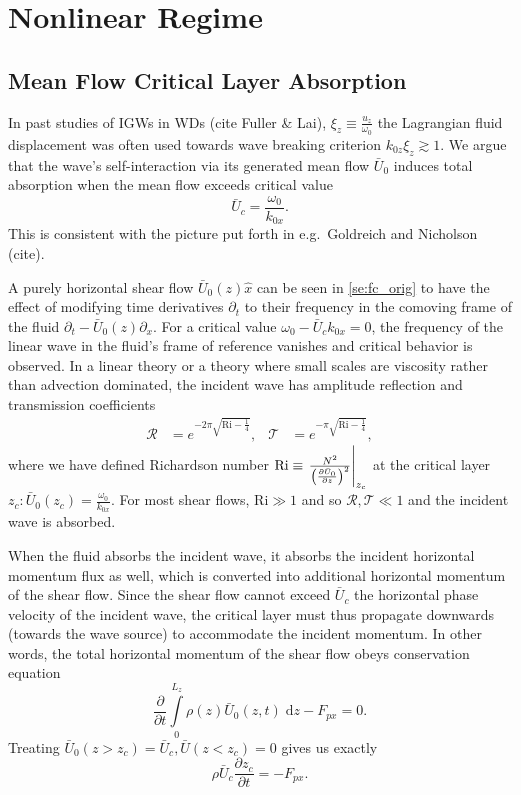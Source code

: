 \documentclass[twocolumn,
        usenames, %
        dvipsnames %
    ]{revtex4-1}%
\newcommand*{\pd}[2]{\frac{\partial#1}{\partial#2}}
\newcommand*{\at}[1]{\left.#1\right|}
\DeclarePairedDelimiter\p{\lparen}{\rparen}
\begin{document}
\section{Nonlinear Regime}\label{s:nonlin}

\subsection{Mean Flow Critical Layer Absorption}

In past studies of IGWs in WDs (cite Fuller \& Lai), $\xi_z \equiv
\frac{u_z}{\omega_0}$ the Lagrangian fluid displacement was often used towards
wave breaking criterion $k_{0z}\xi_z \gtrsim 1$. We argue that the wave's
self-interaction via its generated mean flow $\bar{U}_0$ induces total
absorption when the mean flow exceeds critical value
\begin{equation}
    \bar{U}_c = \frac{\omega_0}{k_{0x}}.
\end{equation}
This is consistent with the picture put forth in e.g.\ Goldreich and Nicholson
(cite).

A purely horizontal shear flow $\bar{U}_0(z) \hat{x}$ can be seen in
\autoref{se:fc_orig} to have the effect of modifying time derivatives
$\partial_t$ to their frequency in the comoving frame of the fluid $\partial_t -
\bar{U}_0(z)\partial_x$. For a critical value $\omega_0 - \bar{U}_c k_{0x} = 0$,
the frequency of the linear wave in the fluid's frame of reference vanishes and
critical behavior is observed. In a linear theory or a theory where small scales
are viscosity rather than advection dominated, the incident wave has amplitude
reflection and transmission coefficients
\begin{align}
    \mathcal{R} &= e^{-2\pi \sqrt{\mathrm{Ri} - \frac{1}{4}}}, &
    \mathcal{T} &= e^{-\pi \sqrt{\mathrm{Ri} - \frac{1}{4}}},
    \label{eq:crit_coeffs}
\end{align}
where we have defined Richardson number $\mathrm{Ri} \equiv
\at{\frac{N^2}{\p*{\pd{\bar{U}_0}{z}}^2}}_{z_c}$ at the critical layer $z_c:
\bar{U}_0(z_c) = \frac{\omega_0}{k_{0x}}$. For most shear flows, $\mathrm{Ri}
\gg 1$ and so $\mathcal{R}, \mathcal{T} \ll 1$ and the incident wave is
absorbed.

When the fluid absorbs the incident wave, it absorbs the incident horizontal
momentum flux as well, which is converted into additional horizontal momentum of
the shear flow. Since the shear flow cannot exceed $\bar{U}_c$ the horizontal
phase velocity of the incident wave, the critical layer must thus propagate
downwards (towards the wave source) to accommodate the incident momentum. In
other words, the total horizontal momentum of the shear flow obeys conservation
equation
\begin{equation}
    \pd{}{t}\int\limits_0^{L_z} \rho(z) \bar{U}_0(z, t)\;\mathrm{d}z
        - F_{px} = 0.
\end{equation}
Treating $\bar{U}_0(z > z_c) = \bar{U}_c, \bar{U}(z < z_c) = 0$ gives us exactly
\begin{equation}
    \rho \bar{U}_c\pd{z_c}{t} = -F_{px}.\label{eq:zc_anal}
\end{equation}
\end{document}
